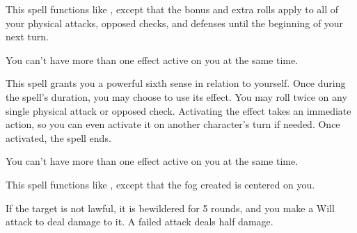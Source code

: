 \begin{spelleffect}
    This spell functions like , except that the bonus and extra rolls apply to all of your physical attacks, opposed checks, and defenses until the beginning of your next turn.
\end{spelleffect}
\begin{spellnotes}
    You can't have more than one  effect active on you at the same time.
\end{spellnotes}

\begin{spelleffect}
    This spell grants you a powerful sixth sense in relation to yourself. Once during the spell's duration, you may choose to use its effect. You may roll twice on any single physical attack or opposed check. Activating the effect takes an immediate action, so you can even activate it on another character's turn if needed. Once activated, the spell ends.
\end{spelleffect}
\begin{spellnotes}
    You can't have more than one  effect active on you at the same time.
\end{spellnotes}

\begin{comment}
\subsubsection{O-P}
\end{comment}

\begin{spelleffect}
    This spell functions like , except that the fog created is centered on you.
\end{spelleffect}

\begin{spelleffect}
    If the target is not lawful, it is bewildered for 5 rounds, and you make a Will attack to deal damage to it. A failed attack deals half damage.
\end{spelleffect}

